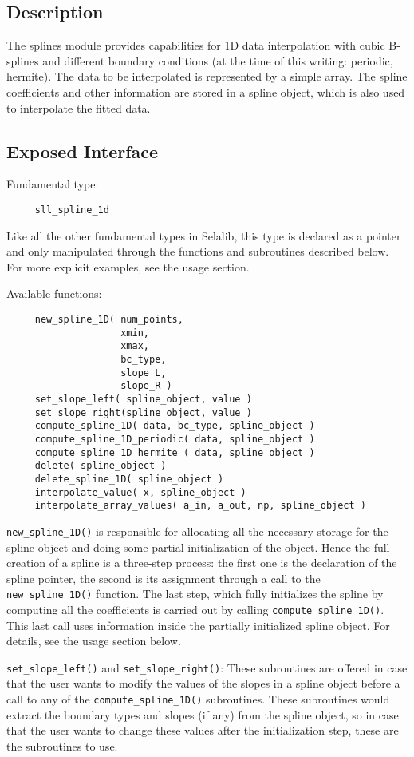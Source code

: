 \documentclass[]{report}   %
\begin{document}
\subsection{Description}
The splines module provides capabilities for 1D data interpolation with cubic B-splines and different boundary conditions (at the time of this writing: periodic, hermite). The data to be interpolated is represented by a simple array.  The spline coefficients and other information are stored in a spline object, which is also used to interpolate the fitted data.
\subsection{Exposed Interface}
Fundamental type:
\begin{verbatim}
     sll_spline_1d
\end{verbatim}
Like all the other fundamental types in Selalib, this type is declared as a pointer and only manipulated through the functions and subroutines described below. For more explicit examples, see the usage section.

Available functions:
\begin{verbatim}
     new_spline_1D( num_points, 
                    xmin, 
                    xmax, 
                    bc_type, 
                    slope_L, 
                    slope_R )  
     set_slope_left( spline_object, value )
     set_slope_right(spline_object, value )
     compute_spline_1D( data, bc_type, spline_object )
     compute_spline_1D_periodic( data, spline_object )
     compute_spline_1D_hermite ( data, spline_object )
     delete( spline_object )
     delete_spline_1D( spline_object )
     interpolate_value( x, spline_object )
     interpolate_array_values( a_in, a_out, np, spline_object )
\end{verbatim}
\verb+new_spline_1D()+ is responsible for allocating all the necessary storage for the spline object and doing some partial initialization of the object. Hence the full creation of a spline is a three-step process: the first one is the declaration of the spline pointer, the second is its assignment through a call to the \verb+new_spline_1D()+ function. The last step, which fully initializes the spline by computing all the coefficients is carried out by calling \verb+compute_spline_1D()+. This last call uses information inside the partially initialized spline object. For details, see the usage section below. 

\verb+set_slope_left()+ and \verb+set_slope_right()+: These subroutines are offered in case that the user wants to modify the values of the slopes in a spline object before a call to any of the \verb+compute_spline_1D()+ subroutines. These subroutines would extract the boundary types and slopes (if any) from the spline object, so in case that the user wants to change these values after the initialization step, these are the subroutines to use.
\end{document}
